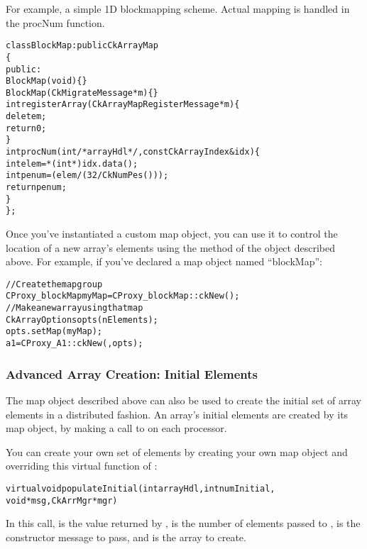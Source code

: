 For example, a simple 1D blockmapping scheme.  Actual mapping is
handled in the procNum function.

\begin{alltt}
class BlockMap : public CkArrayMap 
\{
 public:
  BlockMap(void) \{\}
  BlockMap(CkMigrateMessage *m)\{\}
  int registerArray(CkArrayMapRegisterMessage *m) \{
    delete m;
    return 0;
  \}
  int procNum(int /*arrayHdl*/,const CkArrayIndex &idx) \{
    int elem=*(int *)idx.data();
    int penum =  (elem/(32/CkNumPes()));
    return penum;
  \}
\};

\end{alltt}
Once you've instantiated a custom map object, you can use it to
control the location of a new array's elements using the
 method of the  object described above.
For example, if you've declared a map object named ``blockMap'':

\begin{alltt}
//Create the map group
  CProxy_blockMap myMap=CProxy_blockMap::ckNew();
//Make a new array using that map
  CkArrayOptions opts(nElements);
  opts.setMap(myMap);
  a1=CProxy_A1::ckNew(,opts);
\end{alltt}



\subsubsection{Advanced Array Creation: Initial Elements}

\label{array initial}

The map object described above can also be used to create
the initial set of array elements in a distributed fashion.
An array's initial elements are created by its map object,
by making a call to  on each processor.

You can create your own set of elements by creating your
own map object and overriding this virtual function of :

\begin{alltt}
  virtual void populateInitial(int arrayHdl,int numInitial,
	void *msg,CkArrMgr *mgr)
\end{alltt}

In this call,  is the value returned by ,
 is the number of elements passed to ,
 is the constructor message to pass, and  is the
array to create.

